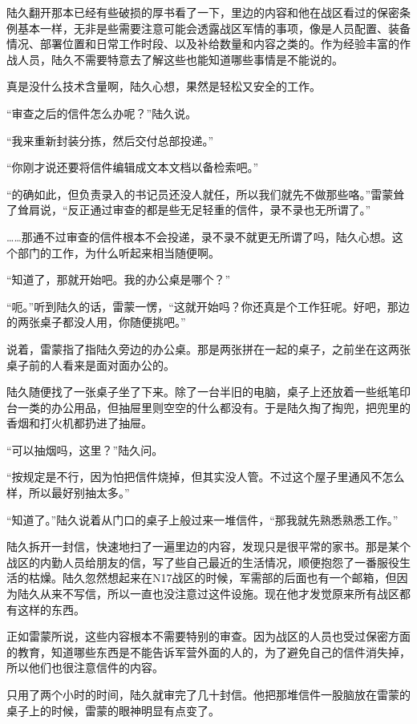陆久翻开那本已经有些破损的厚书看了一下，里边的内容和他在战区看过的保密条例基本一样，无非是些需要注意可能会透露战区军情的事项，像是人员配置、装备情况、部署位置和日常工作时段、以及补给数量和内容之类的。作为经验丰富的作战人员，陆久不需要特意去了解这些也能知道哪些事情是不能说的。

真是没什么技术含量啊，陆久心想，果然是轻松又安全的工作。

“审查之后的信件怎么办呢？”陆久说。

“我来重新封装分拣，然后交付总部投递。”

“你刚才说还要将信件编辑成文本文档以备检索吧。”

“的确如此，但负责录入的书记员还没人就任，所以我们就先不做那些咯。”雷蒙耸了耸肩说，“反正通过审查的都是些无足轻重的信件，录不录也无所谓了。”

……那通不过审查的信件根本不会投递，录不录不就更无所谓了吗，陆久心想。这个部门的工作，为什么听起来相当随便啊。

“知道了，那就开始吧。我的办公桌是哪个？”

“呃。”听到陆久的话，雷蒙一愣，“这就开始吗？你还真是个工作狂呢。好吧，那边的两张桌子都没人用，你随便挑吧。”

说着，雷蒙指了指陆久旁边的办公桌。那是两张拼在一起的桌子，之前坐在这两张桌子前的人看来是面对面办公的。

陆久随便找了一张桌子坐了下来。除了一台半旧的电脑，桌子上还放着一些纸笔印台一类的办公用品，但抽屉里则空空的什么都没有。于是陆久掏了掏兜，把兜里的香烟和打火机都扔进了抽屉。

“可以抽烟吗，这里？”陆久问。

“按规定是不行，因为怕把信件烧掉，但其实没人管。不过这个屋子里通风不怎么样，所以最好别抽太多。”

“知道了。”陆久说着从门口的桌子上般过来一堆信件，“那我就先熟悉熟悉工作。”

陆久拆开一封信，快速地扫了一遍里边的内容，发现只是很平常的家书。那是某个战区的内勤人员给朋友的信，写了些自己最近的生活情况，顺便抱怨了一番服役生活的枯燥。陆久忽然想起来在N17战区的时候，军需部的后面也有一个邮箱，但因为陆久从来不写信，所以一直也没注意过这件设施。现在他才发觉原来所有战区都有这样的东西。

正如雷蒙所说，这些内容根本不需要特别的审查。因为战区的人员也受过保密方面的教育，知道哪些东西是不能告诉军营外面的人的，为了避免自己的信件消失掉，所以他们也很注意信件的内容。

只用了两个小时的时间，陆久就审完了几十封信。他把那堆信件一股脑放在雷蒙的桌子上的时候，雷蒙的眼神明显有点变了。

